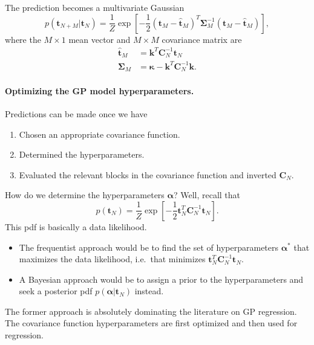 \documentclass[%
oneside,                 %
final,                   %
10pt]{article}
\begin{document}
The prediction becomes a multivariate Gaussian
\[
p \left( \boldsymbol{t}_{N+M} | \boldsymbol{t}_N \right) = \frac{1}{Z} \exp
\left[
-\frac{1}{2} \left( \boldsymbol{t}_M - \hat{\boldsymbol{t}}_M \right)^T \boldsymbol{\Sigma}_M^{-1} \left( \boldsymbol{t}_M - \hat{\boldsymbol{t}}_M \right)
\right],
\]
where the $M \times 1$ mean vector and $M \times M$ covariance matrix are
\begin{align*}
\hat{\boldsymbol{t}}_M &= \boldsymbol{k}^T \boldsymbol{C}_N^{-1} \boldsymbol{t}_N \\
\boldsymbol{\Sigma}_M &= \boldsymbol{\kappa} - \boldsymbol{k}^T \boldsymbol{C}_N^{-1} \boldsymbol{k}.
\end{align*}


\paragraph{Optimizing the GP model hyperparameters.}
Predictions can be made once we have
\begin{enumerate}
\item Chosen an appropriate covariance function.

\item Determined the hyperparameters.

\item Evaluated the relevant blocks in the covariance function and inverted $\boldsymbol{C}_N$.
\end{enumerate}

\noindent
How do we determine the hyperparameters $\boldsymbol{\alpha}$? Well, recall that
\[
p \left( \boldsymbol{t}_N \right) = \frac{1}{Z} \exp \left[ -\frac{1}{2} \boldsymbol{t}_N^T \boldsymbol{C}_{N}^{-1} \boldsymbol{t}_N 
\right].
\]
This pdf is basically a data likelihood.

\begin{itemize}
\item The frequentist approach would be to find the set of hyperparameters $\boldsymbol{\alpha}^*$ that maximizes the data likelihood, i.e.~that minimizes $\boldsymbol{t}_N^T \boldsymbol{C}_{N}^{-1} \boldsymbol{t}_N$.

\item A Bayesian approach would be to assign a prior to the hyperparameters and seek a posterior pdf $p(\boldsymbol{\alpha} | \boldsymbol{t}_N)$ instead.
\end{itemize}

\noindent
The former approach is absolutely dominating the literature on GP regression. The covariance function hyperparameters are first optimized and then used for regression.



\end{document}
